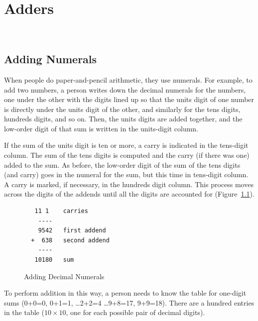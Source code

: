 \chapter{Adders}
\label{ch:adders}\


\section{Adding Numerals}
\label{sec:addition-by-numeral}

When people do paper-and-pencil arithmetic,
they use numerals.
For example, to add two numbers, a person
writes down the decimal numerals for the numbers,
one under the other with the digits lined up so that
the units digit of one number is directly under
the units digit of the other, and similarly for
the tens digits, hundreds digits, and so on.
Then, the units digits are added together,
and the low-order digit of that sum is written
in the units-digit column.

If the sum of the units digit is ten or more, a 
carry is indicated in the tens-digit column.
The sum of the tens digits is computed and the
carry (if there was one) added to the sum.
As before, the low-order digit of the sum of the
tens digits (and carry) goes in the numeral for the sum,
but this time in tens-digit column.
A carry is marked, if necessary,
in the hundreds digit column.
This process moves across the digits of the addends until all the digits
are accounted for (Figure~\ref{fig:adding-decimal-numerals}).

\begin{figure}
\begin{center}
\begin{minipage}[b]{0.4\textwidth}
\begin{verbatim}
   11 1    carries
    ----
    9542   first addend
  +  638   second addend
    ----
   10180   sum
\end{verbatim}
\end{minipage}
\end{center}
\caption{Adding Decimal Numerals}
\label{fig:adding-decimal-numerals}
\end{figure}

To perform addition in this way, a person needs to know
the table for one-digit sums (0+0=0, 0+1=1, \dots 2+2=4 \dots 9+8=17, 9+9=18).
There are a hundred entries in the table ($10 \times 10$, one for each
possible pair of decimal digits).


